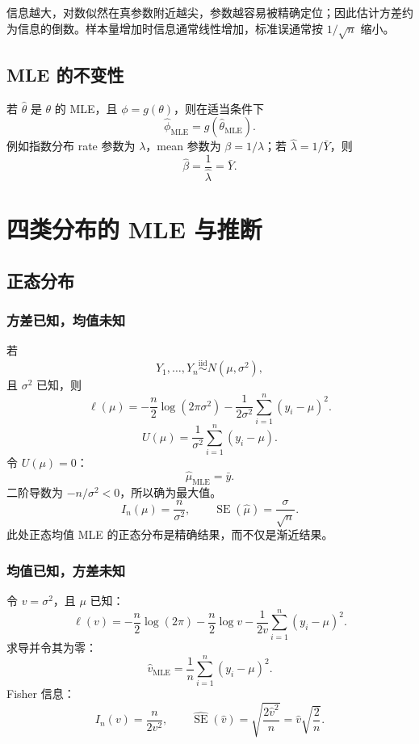 \documentclass[11pt,a4paper]{article}
\newcommand{\SE}{\operatorname{SE}}
\newcommand{\iid}{\overset{\mathrm{iid}}{\sim}}
\newcommand{\1}{\mathbf{1}}
\begin{document}
\begin{conceptbox}
信息越大，对数似然在真参数附近越尖，参数越容易被精确定位；因此估计方差约为信息的倒数。样本量增加时信息通常线性增加，标准误通常按 $1/\sqrt n$ 缩小。
\end{conceptbox}

\subsection{MLE 的不变性}

若 $\hat\theta$ 是 $\theta$ 的 MLE，且 $\phi=g(\theta)$，则在适当条件下
\[
  \boxed{
  \hat\phi_{\mathrm{MLE}}=g(\hat\theta_{\mathrm{MLE}}).
  }
\]
例如指数分布 rate 参数为 $\lambda$，mean 参数为
$\beta=1/\lambda$；若 $\hat\lambda=1/\bar Y$，则
\[
  \hat\beta=\frac1{\hat\lambda}=\bar Y.
\]

\section{四类分布的 MLE 与推断}

\subsection{正态分布}

\subsubsection{方差已知，均值未知}

若
\[
  Y_1,\ldots,Y_n\iid N(\mu,\sigma^2),
\]
且 $\sigma^2$ 已知，则
\[
  \ell(\mu)
  =
  -\frac n2\log(2\pi\sigma^2)
  -
  \frac1{2\sigma^2}\sum_{i=1}^n(y_i-\mu)^2.
\]
\[
  U(\mu)
  =
  \frac1{\sigma^2}\sum_{i=1}^n(y_i-\mu).
\]
令 $U(\mu)=0$：
\[
  \boxed{\hat\mu_{\mathrm{MLE}}=\bar y.}
\]
二阶导数为 $-n/\sigma^2<0$，所以确为最大值。
\[
  \boxed{
  I_n(\mu)=\frac n{\sigma^2},
  \qquad
  \SE(\hat\mu)=\frac{\sigma}{\sqrt n}.
  }
\]
此处正态均值 MLE 的正态分布是精确结果，而不仅是渐近结果。

\subsubsection{均值已知，方差未知}

令 $v=\sigma^2$，且 $\mu$ 已知：
\[
  \ell(v)
  =
  -\frac n2\log(2\pi)
  -\frac n2\log v
  -\frac1{2v}\sum_{i=1}^n(y_i-\mu)^2.
\]
求导并令其为零：
\[
  \boxed{
  \hat v_{\mathrm{MLE}}
  =
  \frac1n\sum_{i=1}^n(y_i-\mu)^2.
  }
\]
Fisher 信息：
\[
  \boxed{
  I_n(v)=\frac{n}{2v^2},
  \qquad
  \widehat{\SE}(\hat v)
  =
  \sqrt{\frac{2\hat v^2}{n}}
  =
  \hat v\sqrt{\frac2n}.
  }
\]
\end{document}

